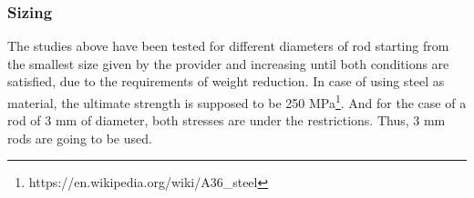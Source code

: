   \subsubsection{Sizing} %
  \label{ssub:sizing}
  The studies above have been tested for different diameters of rod starting from the smallest size given by the provider and increasing until both conditions are satisfied, due to the requirements of weight reduction.
  In case of using steel as material, the ultimate strength is supposed to be 250 MPa\footnote{https://en.wikipedia.org/wiki/A36\_steel}.
  And for the case of a rod of 3 mm of diameter, both stresses are under the restrictions.
  Thus, 3 mm rods are going to be used.
